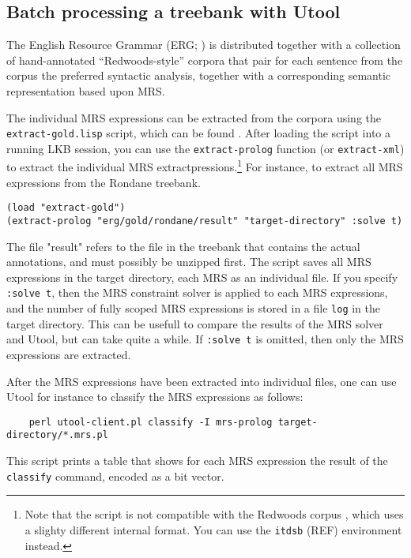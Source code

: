 \subsection{Batch processing a treebank with Utool}

The English Resource Grammar (ERG; ) is distributed together
with a collection of hand-annotated ``Redwoods-style'' corpora that pair for
each sentence from the corpus the preferred syntactic analysis, together with
a corresponding semantic representation based upon MRS.

The individual MRS expressions can be extracted from the corpora using the
\verb|extract-gold.lisp| script, which can be found . After
loading the script into a running LKB session, you can use the
\verb|extract-prolog| function (or \verb|extract-xml|) to extract the
individual MRS extractpressions.\footnote{Note that the script is not
compatible with the Redwoods corpus \cite{something}, which uses a slighty
different internal format. You can use the \texttt{itdsb} (REF) environment
instead.} For instance, to extract all MRS expressions from the Rondane
treebank.

\begin{verbatim}
(load "extract-gold")
(extract-prolog "erg/gold/rondane/result" "target-directory" :solve t)
\end{verbatim}

The file "result" refers to the file in the treebank that contains the actual
annotations, and must possibly be unzipped first. The script saves all MRS
expressions in the target directory, each MRS as an individual file. If you
specify \verb|:solve t|, then the MRS constraint solver is applied to each
MRS expressions, and the number of fully scoped MRS expressions is stored in
a file \verb|log| in the target directory. This can be usefull to compare the
results of the MRS solver and Utool, but can take quite a while. If
\verb|:solve t| is omitted, then only the MRS expressions are extracted.

After the MRS expressions have been extracted into individual files, one can
use Utool for instance to classify the MRS expressions as follows:
\begin{verbatim}
	perl utool-client.pl classify -I mrs-prolog target-directory/*.mrs.pl 
\end{verbatim} 

This script prints a table that shows for each MRS expression the result of
the \verb|classify| command, encoded as a bit vector.





